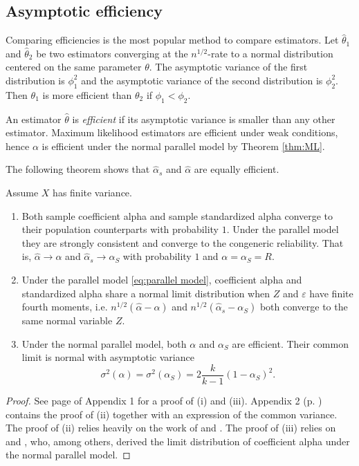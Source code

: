 \documentclass[twoside]{article}
\begin{document}
\subsection{Asymptotic efficiency}
Comparing efficiencies is the most popular method to compare estimators. Let $\hat{\theta}_1$ and $\hat{\theta}_2$ be two estimators converging at the $n^{1/2}$-rate to a normal distribution centered on the same parameter $\theta$. The asymptotic variance of the first distribution is $\phi_1^2$ and the asymptotic variance of the second distribution is $\phi_2^2$. Then $\theta_1$ is more efficient than $\theta_2$ if $\phi_1<\phi_2$. 

An estimator $\hat{\theta}$ is \textit{efficient} \citep[][Section 4.3]{Lehmann2004-ke} if its asymptotic variance is smaller than any other estimator. Maximum likelihood estimators are efficient under weak conditions, hence $\alpha$ is efficient under the normal parallel model by Theorem \ref{thm:ML}.  

The following theorem shows that $\hat{\alpha}_s$ and $\hat{\alpha}$ are equally efficient.

\begin{thm}
\label{thm:asymptotics}
Assume $X$ has finite variance. 
\begin{enumerate}[label=(\roman*)]
    \item Both sample coefficient alpha and sample standardized alpha converge to their population counterparts with probability $1$. Under the parallel model they are strongly consistent and converge to the congeneric reliability. That is, $\hat{\alpha}\to\alpha$ and $\hat{\alpha}_s\to\alpha_S$ with probability $1$ and $\alpha = \alpha_S =  R$.
    \item Under the parallel model \eqref{eq:parallel model}, coefficient alpha and standardized alpha share a normal limit distribution when $Z$ and $\varepsilon$ have finite fourth moments, i.e. $n^{1/2}(\hat{\alpha} - \alpha)$ and  $n^{1/2}(\hat{\alpha}_s - \alpha_S)$ both converge to the same normal variable $Z$.
    \item Under the normal parallel model, both $\alpha$ and $\alpha_S$ are efficient. Their common limit is normal with asymptotic variance 
    $$\sigma^{2}(\alpha)= \sigma^{2}(\alpha_S)=2\frac{k}{k-1}(1-\alpha_S)^{2}.$$
\end{enumerate}
\end{thm}    
\begin{proof}
See page \pageref{proof:asymptotics} of Appendix 1 for a proof of (i) and (iii). Appendix 2 (p. \pageref{Appendix 2}) contains the proof of (ii) together with an expression of the common variance. The proof of (ii) relies heavily on the work of \citet{Van_Zyl2000-si} and \citet{hayashi2005note}. The proof of (iii) relies on \citet[][eq. 13]{Van_Zyl2000-si} and \citet[][eq. 58]{Kristof1963-tb}, who, among others, derived the limit distribution of coefficient alpha under the normal parallel model.
\end{proof}
\end{document}
